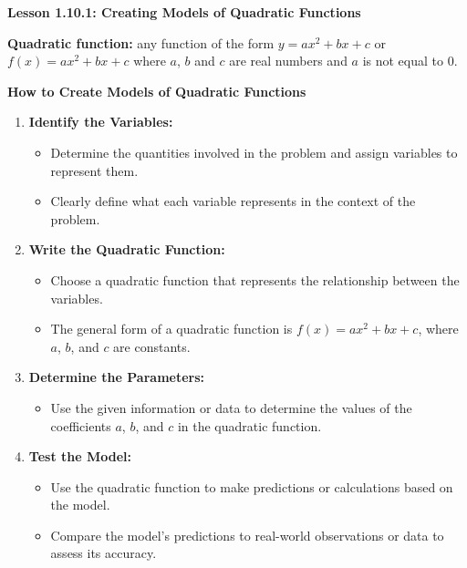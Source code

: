\begin{center}
\textbf{Lesson 1.10.1: Creating Models of Quadratic Functions}
\end{center}

\vspace*{1ex}
\textbf{Quadratic function:} any function of the form $ y = ax^{2} + bx + c $ or $ f(x) = ax^{2} + bx + c $
where $a$, $b$ and $c$ are real numbers and $a$ is not 
equal to 0. 

\textbf{How to Create Models of Quadratic Functions}
\begin{enumerate}
    \item \textbf{Identify the Variables:}
    \begin{itemize}
        \item Determine the quantities involved in the problem and assign variables to represent them.
        \item Clearly define what each variable represents in the context of the problem.
    \end{itemize}
    
    \item \textbf{Write the Quadratic Function:}
    \begin{itemize}
        \item Choose a quadratic function that represents the relationship between the variables.
        \item The general form of a quadratic function is \( f(x) = ax^2 + bx + c \), where \( a \), \( b \), and \( c \) are constants.
    \end{itemize}
    
    \item \textbf{Determine the Parameters:}
    \begin{itemize}
        \item Use the given information or data to determine the values of the coefficients \( a \), \( b \), and \( c \) in the quadratic function.
    \end{itemize}
    
    \item \textbf{Test the Model:}
    \begin{itemize}
        \item Use the quadratic function to make predictions or calculations based on the model.
        \item Compare the model's predictions to real-world observations or data to assess its accuracy.
    \end{itemize}
\end{enumerate}

